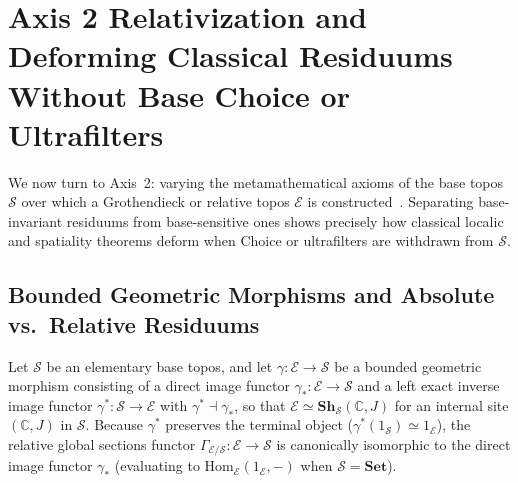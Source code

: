 \documentclass[10pt,twoside,openright]{book}
\theoremstyle{crmplain}
\theoremstyle{crmdef}
\theoremstyle{crmremark}
\begin{document}
\section{Axis 2 Relativization and Deforming Classical Residuums Without Base Choice or Ultrafilters}

We now turn to Axis~2: varying the metamathematical axioms of the base topos $\mathcal{S}$ over which a Grothendieck or relative topos $\mathcal{E}$ is constructed~\cite{Johnstone02,MacLaneMoerdijk92}. Separating base-invariant residuums from base-sensitive ones shows precisely how classical localic and spatiality theorems deform when Choice or ultrafilters are withdrawn from $\mathcal{S}$.

\subsection{Bounded Geometric Morphisms and Absolute vs.\ Relative Residuums}

Let $\mathcal{S}$ be an elementary base topos, and let $\gamma: \mathcal{E} \to \mathcal{S}$ be a bounded geometric morphism consisting of a direct image functor $\gamma_*: \mathcal{E} \to \mathcal{S}$ and a left exact inverse image functor $\gamma^*: \mathcal{S} \to \mathcal{E}$ with $\gamma^* \dashv \gamma_*$, so that $\mathcal{E} \simeq \mathbf{Sh}_{\mathcal{S}}(\mathbb{C}, J)$ for an internal site $(\mathbb{C}, J)$ in $\mathcal{S}$. Because $\gamma^*$ preserves the terminal object ($\gamma^*(1_{\mathcal{S}}) \simeq 1_{\mathcal{E}}$), the relative global sections functor $\Gamma_{\mathcal{E}/\mathcal{S}}: \mathcal{E} \to \mathcal{S}$ is canonically isomorphic to the direct image functor $\gamma_*$ (evaluating to $\mathrm{Hom}_{\mathcal{E}}(1_{\mathcal{E}}, -)$ when $\mathcal{S} = \mathbf{Set}$).
\end{document}
